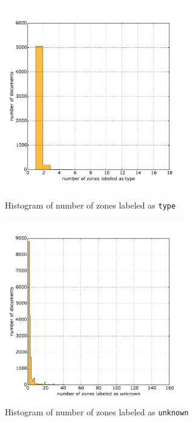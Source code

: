   \begin{figure}
\centering
\begin{minipage}[t!]{0.48\linewidth}
  \includegraphics[width=8cm]{plots/type_histogram}
  \caption{Histogram of number of zones labeled as \texttt{type}}
  \label{fig:type_histogram}
\end{minipage}
\quad
\begin{minipage}[t!]{0.48\linewidth}
  \includegraphics[width=8cm]{plots/unknown_histogram}
  \caption{Histogram of number of zones labeled as \texttt{unknown}}
  \label{fig:unknown_histogram}
\end{minipage}
\end{figure}


